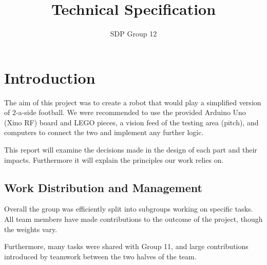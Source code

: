 \documentclass[12pt,a4paper,titlepage]{article}
\author{SDP Group 12}
\title{Technical Specification}
\begin{document}
\maketitle

\tableofcontents
\clearpage




\section{Introduction}

The aim of this project was to create a robot that would play a simplified version of 2-a-side football. We were recommended to use the provided Arduino Uno (Xino RF) board and LEGO pieces, a vision feed of the testing area (pitch), and computers to connect the two and implement any further logic.

This report will examine the decisions made in the design of each part and their impacts. Furthermore it will explain the principles our work relies on.


\subsection{Work Distribution and Management}
Overall the group was efficiently split into subgroups working on specific tasks. All team members have made contributions to the outcome of the project, though the weights vary.

Furthermore, many tasks were shared with Group 11, and large contributions introduced by teamwork between the two halves of the team.
\end{document}
